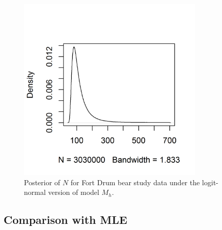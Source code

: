 \begin{figure}[ht]
\centering
\includegraphics[height=3.5in,width=3.5in]{Ch4-Closed/figs/bear-modelMh-post-v2}
\caption{Posterior of $N$ for Fort Drum bear study data under the
logit-normal version of model $M_h$.
}
\label{closed.fig.bearMh}
\end{figure}

\subsection{Comparison with MLE}

